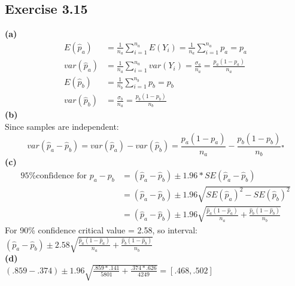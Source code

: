 \documentclass[fleqn]{article}
\begin{document}
\begin{adjustwidth}{-2cm}{-2cm}
\subsection{Exercise 3.15}
\textbf{(a)}
\begin{align*}
E\left(\hat{p}_{a}\right) &= \frac{1}{n_{a}}\sum_{i=1}^{n_{a}}E\left(Y_{i}\right) = \frac{1}{n_{a}}\sum_{i=1}^{n_{a}}p_{a} = p_{a}\\
var\left(\hat{p}_{a}\right) &= \frac{1}{n_{a}}\sum_{i=1}^{n_{a}}var\left(Y_{i}\right) = \frac{\sigma_{a}}{n_{a}} = \frac{p_{a}\left(1-p_{a}\right)}{n_{a}}\\
E\left(\hat{p}_{b}\right) &= \frac{1}{n_{b}}\sum_{i=1}^{n_{b}}p_{b} = p_{b}\\
var\left(\hat{p}_{b}\right) &= \frac{\sigma_{b}}{n_{a}} = \frac{p_{b}\left(1-p_{b}\right)}{n_{b}}
\end{align*}
\textbf{(b)}\\
Since samples are independent:
\begin{equation*}
var\left(\hat{p}_{a} - \hat{p}_{b}\right) = var\left(\hat{p}_{a}\right) - var\left(\hat{p}_{b}\right) = \frac{p_{a}\left(1-p_{a}\right)}{n_{a}} - \frac{p_{b}\left(1-p_{b}\right)}{n_{b}} \square
\end{equation*}
\textbf{(c)}
\begin{align*}
\text{95\% confidence for $p_{a}-p_{b}$} &= \left(\hat{p}_{a}-\hat{p}_{b}\right) \pm 1.96*SE\left(\hat{p}_{a}-\hat{p}_{b}\right)\\
&= \left(\hat{p}_{a}-\hat{p}_{b}\right) \pm 1.96\sqrt{SE\left(\hat{p}_{a}\right)^{2} - SE\left(\hat{p}_{b}\right)^{2}}\\
&= \left(\hat{p}_{a}-\hat{p}_{b}\right) \pm 1.96\sqrt{\frac{\hat{p}_{a}\left(1-\hat{p}_{a}\right)}{n_{a}} + \frac{\hat{p}_{b}\left(1-\hat{p}_{b}\right)}{n_{b}}}
\end{align*}
For 90\% confidence critical value = 2.58, so interval:\\
$\left(\hat{p}_{a}-\hat{p}_{b}\right) \pm 2.58\sqrt{\frac{\hat{p}_{a}\left(1-\hat{p}_{a}\right)}{n_{a}} + \frac{\hat{p}_{b}\left(1-\hat{p}_{b}\right)}{n_{b}}}$\\
\textbf{(d)}\\
$\left(.859-.374\right) \pm 1.96\sqrt{\frac{.859*.141}{5801} + \frac{.374*.626}{4249}} = [.468, .502]$

\end{adjustwidth}
\end{document}
